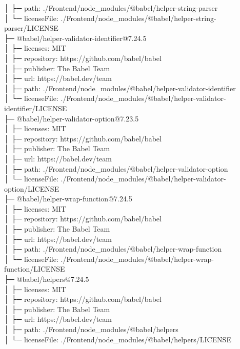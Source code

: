 │  ├─ path: ./Frontend/node\_modules/@babel/helper-string-parser\\
│  └─ licenseFile: ./Frontend/node\_modules/@babel/helper-string-parser/LICENSE\\
├─ @babel/helper-validator-identifier@7.24.5\\
│  ├─ licenses: MIT\\
│  ├─ repository: https://github.com/babel/babel\\
│  ├─ publisher: The Babel Team\\
│  ├─ url: https://babel.dev/team\\
│  ├─ path: ./Frontend/node\_modules/@babel/helper-validator-identifier\\
│  └─ licenseFile: ./Frontend/node\_modules/@babel/helper-validator-identifier/LICENSE\\
├─ @babel/helper-validator-option@7.23.5\\
│  ├─ licenses: MIT\\
│  ├─ repository: https://github.com/babel/babel\\
│  ├─ publisher: The Babel Team\\
│  ├─ url: https://babel.dev/team\\
│  ├─ path: ./Frontend/node\_modules/@babel/helper-validator-option\\
│  └─ licenseFile: ./Frontend/node\_modules/@babel/helper-validator-option/LICENSE\\
├─ @babel/helper-wrap-function@7.24.5\\
│  ├─ licenses: MIT\\
│  ├─ repository: https://github.com/babel/babel\\
│  ├─ publisher: The Babel Team\\
│  ├─ url: https://babel.dev/team\\
│  ├─ path: ./Frontend/node\_modules/@babel/helper-wrap-function\\
│  └─ licenseFile: ./Frontend/node\_modules/@babel/helper-wrap-function/LICENSE\\
├─ @babel/helpers@7.24.5\\
│  ├─ licenses: MIT\\
│  ├─ repository: https://github.com/babel/babel\\
│  ├─ publisher: The Babel Team\\
│  ├─ url: https://babel.dev/team\\
│  ├─ path: ./Frontend/node\_modules/@babel/helpers\\
│  └─ licenseFile: ./Frontend/node\_modules/@babel/helpers/LICENSE\\
